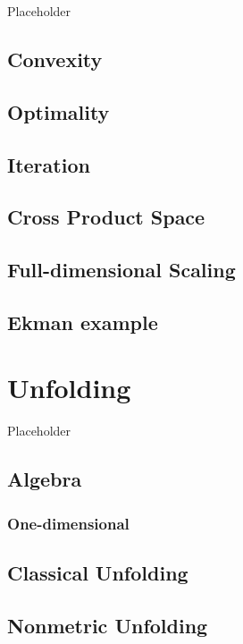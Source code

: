 \documentclass[
  12pt,
]{book}
\begin{document}
Placeholder

\section{Convexity}\label{fullconvex}

\section{Optimality}\label{fulloptimal}

\section{Iteration}\label{fulliteration}

\section{Cross Product Space}\label{fullcpspace}

\section{Full-dimensional Scaling}\label{full-dimensional-scaling}

\section{Ekman example}\label{ekman-example-1}

\chapter{Unfolding}\label{chunfolding}

Placeholder

\section{Algebra}\label{algebra-1}

\subsection{One-dimensional}\label{one-dimensional}

\section{Classical Unfolding}\label{classical-unfolding}

\section{Nonmetric Unfolding}\label{nonmetric-unfolding}
\end{document}
